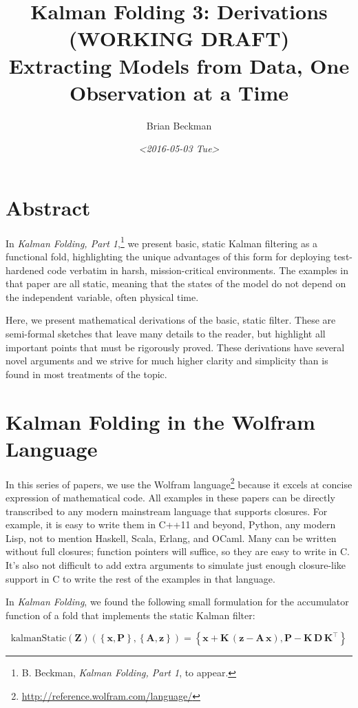 \documentclass[10pt,oneside,x11names]{article}
\author{Brian Beckman}
\date{\textit{<2016-05-03 Tue>}}
\title{Kalman Folding 3: Derivations (WORKING DRAFT)\\\medskip
\large Extracting Models from Data, One Observation at a Time}
\begin{document}
\maketitle
\setcounter{tocdepth}{2}
\tableofcontents


\section{Abstract}
\label{sec:orgheadline1}

In \emph{Kalman Folding, Part 1},\footnote{B. Beckman, \emph{Kalman Folding, Part 1}, to appear.} we present basic, static Kalman filtering
as a functional fold, highlighting the unique advantages of this form for
deploying test-hardened code verbatim in harsh, mission-critical environments.
The examples in that paper are all static, meaning that the states of the model
do not depend on the independent variable, often physical time.

Here, we present mathematical derivations of the basic, static filter. These are
semi-formal sketches that leave many details to the reader, but highlight all
important points that must be rigorously proved. These derivations have several
novel arguments and we strive for much higher clarity and simplicity than is
found in most treatments of the topic.

\section{Kalman Folding in the Wolfram Language}
\label{sec:orgheadline2}

In this series of papers, we use the Wolfram language\footnote{\url{http://reference.wolfram.com/language/}} because it excels
at concise expression of mathematical code. All examples in these papers can be
directly transcribed to any modern mainstream language that supports closures.
For example, it is easy to write them in C++11 and beyond, Python, any modern
Lisp, not to mention Haskell, Scala, Erlang, and OCaml. Many can be written
without full closures; function pointers will suffice, so they are easy to write
in C. It's also not difficult to add extra arguments to simulate just enough
closure-like support in C to write the rest of the examples in that language.


In \emph{Kalman Folding},\footnotemark[1]{} we found the following small formulation for the
accumulator function of a fold that implements the static Kalman filter:

\begin{equation}
\label{eqn:kalman-cume-definition}
\text{kalmanStatic}
\left(
\mathbold{Z}
\right)
\left(
\left\{
\mathbold{x},
\mathbold{P}
\right\},
\left\{
\mathbold{A},
\mathbold{z}
\right\}
\right) =
\left\{
\mathbold{x}+
\mathbold{K}\,
\left(
\mathbold{z}-
\mathbold{A}\,
\mathbold{x}
\right),
\mathbold{P}-
\mathbold{K}\,
\mathbold{D}\,
\mathbold{K}^\intercal
\right\}
\end{equation}
\end{document}
